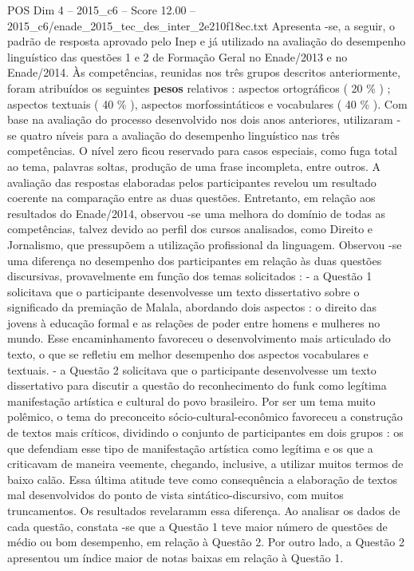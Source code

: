 \begin{textsample}{POS Dim 4 – 2015\_c6 – Score 12.00 – 2015\_c6/enade\_2015\_tec\_des\_inter\_2e210f18ec.txt}
Apresenta -se, a seguir, o padrão de resposta aprovado pelo Inep e já utilizado na avaliação do desempenho linguístico das questões 1 e 2 de Formação Geral no Enade/2013 e no Enade/2014.
Às competências, reunidas nos três grupos descritos anteriormente, foram atribuídos os seguintes \textbf{pesos} relativos : aspectos ortográficos ( 20 \% ) ; aspectos textuais ( 40 \% ), aspectos morfossintáticos e vocabulares ( 40 \% ).
Com base na avaliação do processo desenvolvido nos dois anos anteriores, utilizaram -se quatro níveis para a avaliação do desempenho linguístico nas três competências.
O nível zero ficou reservado para casos especiais, como fuga total ao tema, palavras soltas, produção de uma frase incompleta, entre outros.
A avaliação das respostas elaboradas pelos participantes revelou um resultado coerente na comparação entre as duas questões.
Entretanto, em relação aos resultados do Enade/2014, observou -se uma melhora do domínio de todas as competências, talvez devido ao perfil dos cursos analisados, como Direito e Jornalismo, que pressupõem a utilização profissional da linguagem.
Observou -se uma diferença no desempenho dos participantes em relação às duas questões discursivas, provavelmente em função dos temas solicitados : - a Questão 1 solicitava que o participante desenvolvesse um texto dissertativo sobre o significado da premiação de Malala, abordando dois aspectos : o direito das jovens à educação formal e as relações de poder entre homens e mulheres no mundo.
Esse encaminhamento favoreceu o desenvolvimento mais articulado do texto, o que se refletiu em melhor desempenho dos aspectos vocabulares e textuais. - a Questão 2 solicitava que o participante desenvolvesse um texto dissertativo para discutir a questão do reconhecimento do funk como legítima manifestação artística e cultural do povo brasileiro.
Por ser um tema muito polêmico, o tema do preconceito sócio-cultural-econômico favoreceu a construção de textos mais críticos, dividindo o conjunto de participantes em dois grupos : os que defendiam esse tipo de manifestação artística como legítima e os que a criticavam de maneira veemente, chegando, inclusive, a utilizar muitos termos de baixo calão.
Essa última atitude teve como consequência a elaboração de textos mal desenvolvidos do ponto de vista sintático-discursivo, com muitos truncamentos.
Os resultados revelaramm essa diferença.
Ao analisar os dados de cada questão, constata -se que a Questão 1 teve maior número de questões de médio ou bom desempenho, em relação à Questão 2.
Por outro lado, a Questão 2 apresentou um índice maior de notas baixas em relação à Questão 1.

\end{textsample}
